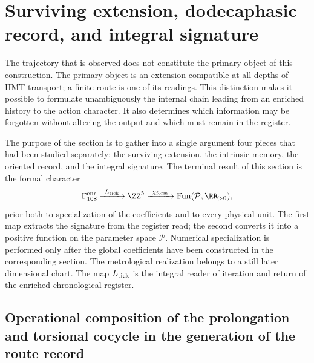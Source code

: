 \chapter{Surviving extension, dodecaphasic record, and integral signature}
\label{chap:extension-ruta-caracter}

The trajectory that is observed does not constitute the primary object of this construction. The primary object is an extension compatible at all depths of HMT transport; a finite route is one of its readings. This distinction makes it possible to formulate unambiguously the internal chain leading from an enriched history to the action character. It also determines which information may be forgotten without altering the output and which must remain in the register.

The purpose of the section is to gather into a single argument four pieces that had
been studied separately: the surviving extension, the intrinsic
memory, the oriented record, and the integral signature. The terminal result of
this section is the formal character
\[
 \Gamma_{108}^{\rm enr}
 \xrightarrow{\ L_{\rm tick}\ }
 \ZZ^5
 \xrightarrow{\ \chi_{\rm form}\ }
 \operatorname{Fun}(\mathcal P,\RR_{>0}),
\]
prior both to specialization of the coefficients and to every physical unit. The first map extracts the signature from the register read; the second converts it into a positive function on the parameter space \(\mathcal P\). Numerical specialization is performed only after the global coefficients have been constructed in the corresponding section. The metrological realization belongs to a still later dimensional chart. The map \(L_{\rm tick}\) is the integral reader of iteration and return of the enriched chronological register.

\section{Operational composition of the prolongation and torsional cocycle in the generation of the route record}

